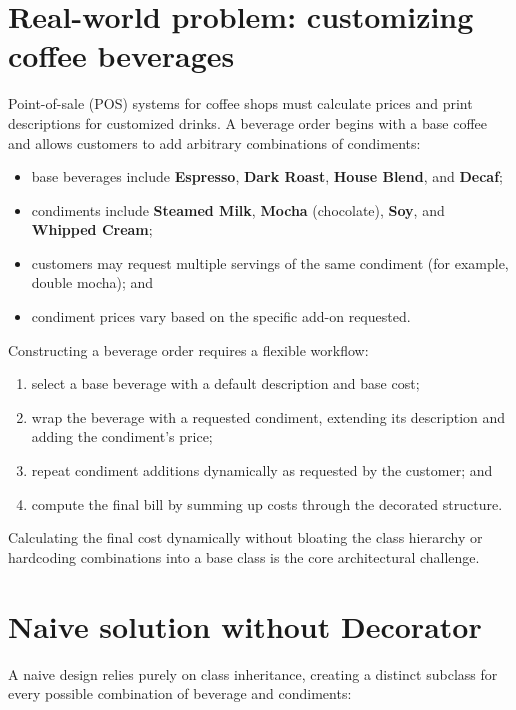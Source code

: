 \documentclass[11pt,a4paper]{report}
\begin{document}
\section{Real-world problem: customizing coffee beverages}
Point-of-sale (POS) systems for coffee shops must calculate prices and print descriptions for customized drinks. A beverage order begins with a base coffee and allows customers to add arbitrary combinations of condiments:
\begin{itemize}
  \item base beverages include \textbf{Espresso}, \textbf{Dark Roast}, \textbf{House Blend}, and \textbf{Decaf};
  \item condiments include \textbf{Steamed Milk}, \textbf{Mocha} (chocolate), \textbf{Soy}, and \textbf{Whipped Cream};
  \item customers may request multiple servings of the same condiment (for example, double mocha); and
  \item condiment prices vary based on the specific add-on requested.
\end{itemize}

Constructing a beverage order requires a flexible workflow:
\begin{enumerate}
  \item select a base beverage with a default description and base cost;
  \item wrap the beverage with a requested condiment, extending its description and adding the condiment's price;
  \item repeat condiment additions dynamically as requested by the customer; and
  \item compute the final bill by summing up costs through the decorated structure.
\end{enumerate}

Calculating the final cost dynamically without bloating the class hierarchy or hardcoding combinations into a base class is the core architectural challenge.

\section{Naive solution without Decorator}
A naive design relies purely on class inheritance, creating a distinct subclass for every possible combination of beverage and condiments:
\end{document}
